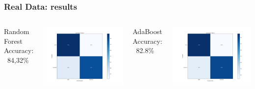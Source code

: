 \begin{frame}[fragile] %
    \frametitle{Real Data: results}
 
\begin{columns}[c] %
    
    Random Forest
    \newline Accuracy: ~84,32\%
    \begin{center}		
		\includegraphics[height=0.3\textheight]{images/confusion_matrix_random_forest.png}
	\end{center}
    
    AdaBoost
    \newline Accuracy: ~82.8\%
	\begin{center}		
		\includegraphics[height=0.3\textheight]{images/confusion_matrix_adaboost.png}
	\end{center}
	

\end{columns}
\end{frame}
